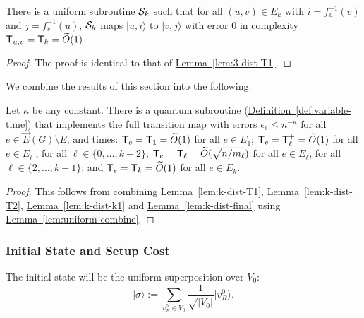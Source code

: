 \documentclass{article}
\newcommand{\lem}[1]{\hyperref[lem:#1]{Lemma~\ref*{lem:#1}}}
\newcommand{\defin}[1]{\hyperref[def:#1]{Definition~\ref*{def:#1}}}
\def\ket#1{{\lvert}#1\rangle}
\renewcommand{\>}{\rangle}
\newcommand{\<}{\langle}
\renewcommand{\(}{\left(}
\renewcommand{\)}{\right)}
\begin{document}
\begin{lemma}\label{lem:k-dist-final}
	There is a uniform subroutine ${\cal S}_k$ such that for all $(u,v)\in E_k$ with $i=f_u^{-1}(v)$ and $j=f_v^{-1}(u)$, ${\cal S}_k$ maps $\ket{u,i}$ to $\ket{v,j}$ with error 0 in complexity ${\sf T}_{u,v}={\sf T}_k=\widetilde{O}(1)$.
\end{lemma}
\begin{proof}
The proof is identical to that of \lem{3-dist-T1}.
\end{proof}


\noindent We combine the results of this section into the following.
\begin{corollary}\label{cor:k-dist-transitions}
Let $\kappa$ be any constant. There is a quantum subroutine (\defin{variable-time}) that implements the full transition map with errors $\epsilon_e\leq n^{-\kappa}$ for all $e\in \overrightarrow{E}(G)\setminus\tilde{E}$, and times: ${\sf T}_e={\sf T}_1=\widetilde{O}(1)$ for all $e\in E_1$; ${\sf T}_e={\sf T}_{\ell}^+=\widetilde{O}(1)$ for all $e\in E_{\ell}^+$, for all $\ell\in\{0,\dots,k-2\}$; ${\sf T}_e={\sf T}_{\ell}=\widetilde{O}(\sqrt{n/m_{\ell}})$ for all $e\in E_{\ell}$, for all $\ell\in\{2,\dots,k-1\}$; and ${\sf T}_e={\sf T}_k=\widetilde{O}(1)$ for all $e\in E_k$. 
\end{corollary}
\begin{proof}
This follows from combining \lem{k-dist-T1}, \lem{k-dist-T2}, \lem{k-dist-k1} and \lem{k-dist-final} using  \lem{uniform-combine}.
\end{proof}

\subsubsection{Initial State and Setup Cost}


The initial state will be the uniform superposition over $V_0$: 
\begin{equation*}
	\ket{\sigma} := \sum_{v^0_{R} \in V_0}\frac{1}{\sqrt{|V_0|}}\ket{v^0_{R}}.
\end{equation*}
\end{document}
